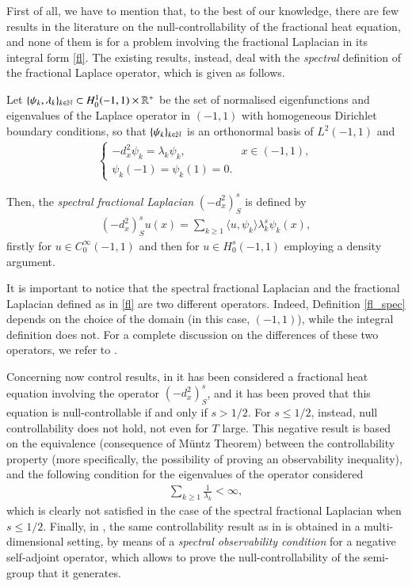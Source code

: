 First of all, we have to mention that, to the best of our knowledge, there are few results in the literature on the null-controllability of the fractional heat equation, and none of them is for a problem involving the fractional Laplacian in its integral form \eqref{fl}. The existing results, instead, deal with the \textit{spectral} definition of the fractional Laplace operator, which is given as follows.

Let $\{\psi_k,\lambda_k\}_{k\in\mathbb{N}}\subset H_0^1(-1,1)\times\mathbb{R}^+$ be the set of normalised eigenfunctions and eigenvalues of the Laplace operator in $(-1,1)$ with homogeneous Dirichlet boundary conditions, so that $\{\psi_k\}_{k\in\mathbb{N}}$ is an orthonormal basis of $L^2(-1,1)$ and         
\begin{align*}
	\begin{cases}
		-d_x^2\psi_k =\lambda_k\psi_k, & x\in (-1,1), 
		\\
		\psi_k(-1)=\psi_k(1)=0.
	\end{cases}
\end{align*}

Then, the \textit{spectral fractional Laplacian} $(-d_x^2)^s_S$ is defined by
\begin{align}\label{fl_spec}
	(-d_x^2)^s_S u(x) = \sum_{k\geq 1}\langle u,\psi_k\rangle \lambda_k^s\psi_k(x),
\end{align}
firstly for $u\in C_0^{\infty}(-1,1)$ and then for $u\in H_0^s(-1,1)$ employing a density argument.

It is important to notice that the spectral fractional Laplacian and the fractional Laplacian defined as in \eqref{fl} are two different operators. Indeed, Definition \eqref{fl_spec} depends on the choice of the domain (in this case, $(-1,1)$), while the integral definition does not. For a complete discussion on the differences of these two operators, we refer to \cite{servadei2014spectrum}.

Concerning now control results, in \cite{micu2006controllability} it has been considered a fractional heat equation involving the operator $(-d_x^2)^s_S$, and it has been proved that this equation is null-controllable if and only if $s>1/2$. For $s\leq 1/2$, instead, null controllability does not hold, not even for $T$ large. This negative result is based on the equivalence (consequence of M\"untz Theorem) between the controllability property (more specifically, the possibility of proving an observability inequality), and the following condition for the eigenvalues of the operator considered
\begin{align}\label{eigen_cond}
	\sum_{k\geq 1} \frac{1}{\lambda_k}<\infty,
\end{align} 
which is clearly not satisfied in the case of the spectral fractional Laplacian when $s\leq 1/2$. Finally, in \cite{miller2006controllability}, the same controllability result as in \cite{micu2006controllability} is obtained in a multi-dimensional setting, by means of a  \textit{spectral observability condition} for a negative self-adjoint operator, which allows to prove the null-controllability of the semi-group that it generates.

